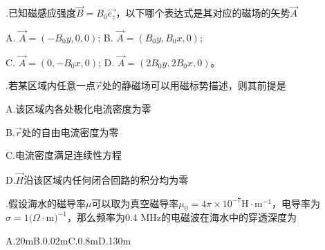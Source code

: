 .\hspace{0.8em}已知磁感应强度$\Vec{B} = B_0 \Vec{e_z}$，以下哪个表达式是其对应的磁场的矢势$\Vec{A}$
\vspace{0.2cm}

A.\hspace{0.8em} $\Vec{A} = (-B_0y , 0, 0)$; \hspace{5em} B.\hspace{0.8em} $\Vec{A} = (B_0y , B_0 x, 0)$; 
\vspace{0.2cm}

C.\hspace{0.8em} $\Vec{A} = (0 , -B_0 x, 0)$; \hspace{5em} D.\hspace{0.8em} $\Vec{A} = (2 B_0y , 2 B_0 x, 0)$。
\vspace{0.2cm}

.\hspace{0.8em}若某区域内任意一点$\Vec{r}$处的静磁场可以用磁标势描述，则其前提是
\vspace{0.2cm}

A.\hspace{0.8em}该区域内各处极化电流密度为零
\vspace{0.2cm}

B.\hspace{0.8em}$\Vec{r}$处的自由电流密度为零
\vspace{0.2cm}

C.\hspace{0.8em}电流密度满足连续性方程
\vspace{0.2cm}

D.\hspace{0.8em}$\Vec{H}$沿该区域内任何闭合回路的积分均为零
\vspace{0.3cm}

.\hspace{0.8em}假设海水的磁导率$\mu$可以取为真空磁导率$\mu_0 = 4 \pi \times 10^{-7} \mathrm {H} \cdot \mathrm{m^{-1} } $，电导率为$\sigma = 1 (\Omega \cdot \mathrm{m )^{-1} }$，那么频率为0.4 MHz的电磁波在海水中的穿透深度为
\vspace{0.2cm}

A.\hspace{0.8em}20m\hspace{5em}B.\hspace{0.8em}0.02m\hspace{5em}C.\hspace{0.8em}0.8m\hspace{5em}D.\hspace{0.8em}130m 
\vspace{0.3cm}

